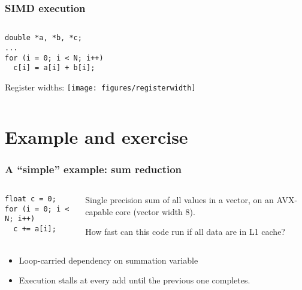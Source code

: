 \documentclass[presentation,aspectratio=43,10pt]{beamer}
\begin{document}
\begin{frame}[fragile]
  \frametitle{SIMD execution}
  \begin{columns}
    \begin{column}{0.4\textwidth}
\begin{verbatim}
double *a, *b, *c;
...
for (i = 0; i < N; i++)
  c[i] = a[i] + b[i];
\end{verbatim}

      \vspace{\baselineskip}
      Register widths:
      \vspace{\baselineskip}
      \texttt{[image: figures/registerwidth]}
    \end{column}
    \begin{column}{0.6\textwidth}
    \end{column}
  \end{columns}
\end{frame}

\section{Example and exercise}

\begin{frame}[fragile]
  \frametitle{A ``simple'' example: sum reduction}
  \begin{columns}
    \begin{column}{0.4\textwidth}
\begin{verbatim}
float c = 0;
for (i = 0; i < N; i++)
  c += a[i];
\end{verbatim}
    \end{column}
    \begin{column}{0.6\textwidth}
      Single precision sum of all values in a vector, on an
      AVX-capable core (vector width 8).

      How fast can this code run if all data are in L1 cache?
    \end{column}
  \end{columns}
  \begin{itemize}
  \item Loop-carried dependency on summation variable
  \item Execution stalls at every add until the previous one completes.
  \end{itemize}
\end{frame}
\end{document}
